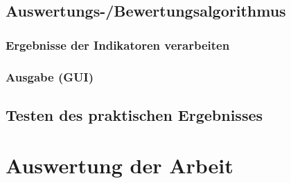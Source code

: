 \documentclass[12pt]{article}
\begin{document}
\subsection{Auswertungs-/Bewertungsalgorithmus}
	\subsubsection{Ergebnisse der Indikatoren verarbeiten}
	\subsubsection{Ausgabe (GUI)}
\subsection{Testen des praktischen Ergebnisses}
\section{Auswertung der Arbeit}
\end{document}
